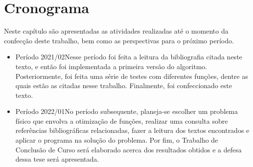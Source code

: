 \chapter{Cronograma}\label{cap_cronograma}

Neste capítulo são apresentadas as atividades realizadas até o momento da confecção deste
trabalho, bem como as perspectivas para o próximo período.

\begin{itemize}
      \item Período 2021/02\trav Nesse período foi feita a leitura da bibliografia citada neste
            texto, e então foi implementada a primeira versão do algoritmo. 
            Posteriormente, foi feita uma série de testes com diferentes funções, dentre as quais
            estão as citadas nesse trabalho. Finalmente, foi confeccionado este texto.
      \item Período 2022/01\trav No período subsequente, planeja-se escolher um problema físico
            que envolva a otimização de funções, realizar uma consulta sobre referências bibliográficas
            relacionadas, fazer a leitura dos textos encontrados e aplicar o programa na solução
            do problema. Por fim, o Trabalho de Conclusão de Curso será elaborado acerca dos
            resultados obtidos e a defesa dessa tese será apresentada.
\end{itemize}
